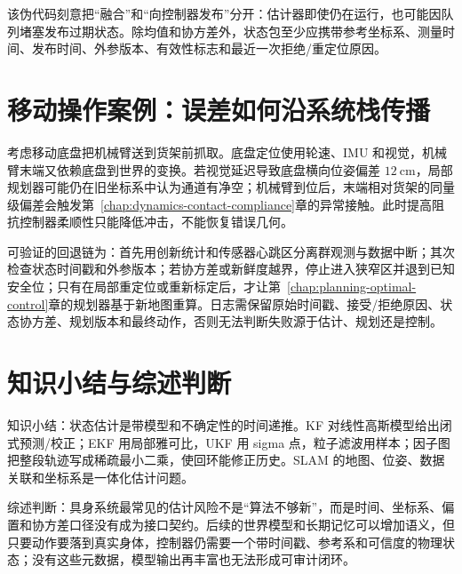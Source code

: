 该伪代码刻意把“融合”和“向控制器发布”分开：估计器即使仍在运行，也可能因队列堵塞发布过期状态。除均值和协方差外，状态包至少应携带参考坐标系、测量时间、发布时间、外参版本、有效性标志和最近一次拒绝/重定位原因。

\section{移动操作案例：误差如何沿系统栈传播}

考虑移动底盘把机械臂送到货架前抓取。底盘定位使用轮速、IMU 和视觉，机械臂末端又依赖底盘到世界的变换。若视觉延迟导致底盘横向位姿偏差 $12\ \mathrm{cm}$，局部规划器可能仍在旧坐标系中认为通道有净空；机械臂到位后，末端相对货架的同量级偏差会触发第~\ref{chap:dynamics-contact-compliance}章的异常接触。此时提高阻抗控制器柔顺性只能降低冲击，不能恢复错误几何。

可验证的回退链为：首先用创新统计和传感器心跳区分离群观测与数据中断；其次检查状态时间戳和外参版本；若协方差或新鲜度越界，停止进入狭窄区并退到已知安全位；只有在局部重定位或重新标定后，才让第~\ref{chap:planning-optimal-control}章的规划器基于新地图重算。日志需保留原始时间戳、接受/拒绝原因、状态协方差、规划版本和最终动作，否则无法判断失败源于估计、规划还是控制。

\section{知识小结与综述判断}

知识小结：状态估计是带模型和不确定性的时间递推。KF 对线性高斯模型给出闭式预测/校正；EKF 用局部雅可比，UKF 用 sigma 点，粒子滤波用样本；因子图把整段轨迹写成稀疏最小二乘，使回环能修正历史。SLAM 的地图、位姿、数据关联和坐标系是一体化估计问题。

综述判断：具身系统最常见的估计风险不是“算法不够新”，而是时间、坐标系、偏置和协方差口径没有成为接口契约。后续的世界模型和长期记忆可以增加语义，但只要动作要落到真实身体，控制器仍需要一个带时间戳、参考系和可信度的物理状态；没有这些元数据，模型输出再丰富也无法形成可审计闭环。
